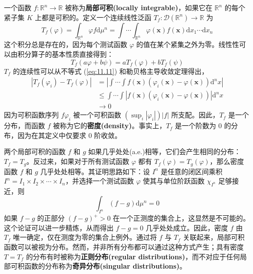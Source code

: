 一个函数 $f: \mathbb{R}^n \to \mathbb{R}$
被称为\textbf{局部可积(locally integrable)}，如果它在 $\mathbb{R}^n$
的每个紧子集 $K$ 上都是可积的。定义一个连续线性泛函
$T_f: \mathcal{D}(\mathbb{R}^n) \to \mathbb{R}$ 为
$$
T_f(\varphi) = \int_{\mathbb{R}^n} \varphi f \mathrm{d}\mu^n = \int \cdots \int_{\mathbb{R}^n} \varphi(\mathbf{x}) f(\mathbf{x}) \mathrm{d}x_1 \cdots \mathrm{d}x_n
$$
这个积分总是存在的，因为每个测试函数 $\varphi$
的值在某个紧集之外为零。线性性可以由积分算子的基本性质直接得到：
$$
T_f(a \varphi + b \psi) = a T_f(\varphi) + b T_f(\psi)
$$
$T_f$ 的连续性可以从不等式 (\ref{eq:11.11}) 和勒贝格主导收敛定理得出，
$$
\begin{aligned}
\left|T_f(\varphi_i) - T_f(\varphi)\right| &= \left|\int \cdots \int f(\mathbf{x})\left(\varphi_i(\mathbf{x}) - \varphi(\mathbf{x})\right) \mathrm{d}^n x\right| \\
&\leq \int \cdots \int \left|f(\mathbf{x})\left(\varphi_i(\mathbf{x}) - \varphi(\mathbf{x})\right)\right| \mathrm{d}^n x \\
&\to 0
\end{aligned}
$$
因为可积函数序列 $f \varphi_i$ 被一个可积函数
$\left(\sup_i |\varphi_i|\right)|f|$ 所支配。因此，$T_f$
是一个分布，而函数 $f$
被称为它的\textbf{密度(density)}。事实上，$T_f$ 是一个阶数为 0
的分布，因为在其定义中仅要求 0 阶收敛。

两个局部可积的函数 $f$ 和 $g$
如果几乎处处(a.e.)相等，它们会产生相同的分布：$T_f = T_g$。反过来，如果对于所有测试函数
$\varphi$ 都有 $T_f(\varphi) = T_g(\varphi)$，那么密度函数 $f$ 和
$g$ 几乎处处相等。其证明思路如下：设 $I^n$ 是任意的闭区间乘积
$I^n = I_1 \times I_2 \times \cdots \times I_n$，并选择一个测试函数
$\varphi$ 使其与单位阶跃函数 $\chi_{I^n}$ 足够接近，则
$$
\int_{I^n}(f - g) \mathrm{d}\mu^n = 0
$$
如果 $f - g$ 的正部分 $(f - g)^+ > 0$
在一个正测度的集合上，这显然是不可能的。这个论证可以进一步精炼，从而得出
$f - g = 0$ 几乎处处成立。因此，密度 $f$ 由 $T_f$
唯一确定，仅在测度为零的集合上例外。通过将 $f$ 与 $T_f$
关联起来，局部可积函数可以被视为分布。然而，并非所有分布都可以通过这种方式产生；具有密度
$T = T_f$ 的分布有时被称为\textbf{正则分布(regular distributions)}，而不对应于任何局部可积函数的分布称为\textbf{奇异分布(singular distributions)}。

